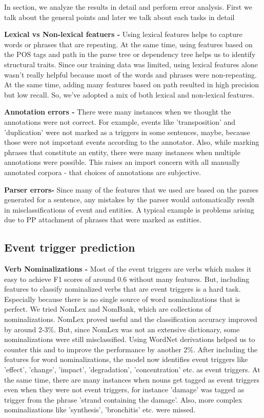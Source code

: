 In section, we analyze the results in detail and perform error analysis. First we talk about the general points and later we talk about each tasks in detail

{\bf Lexical vs Non-lexical featuers -} Using lexical features helps to capture words or phrases that are repeating. At the same time, using features based on the POS tags and path in the parse tree or dependency tree helps us to identify structural traits. Since our training data was limited, using lexical features alone wasn't really helpful because most of the words and phrases were non-repeating. At the same time, adding many features based on path resulted in high precision but low recall. So, we've adopted a mix of both lexical and non-lexical features.

{\bf Annotation errors -} There were many instances when we thought the annotations were not correct. For example, events like 'transposition' and 'duplication' were not marked as a triggers in some sentences, maybe, because those were not important events according to the annotator. Also, while marking phrases that constitute an entity, there were many instances when multiple annotations were possible. This raises an import concern with all manually annotated corpora - that choices of annotations are subjective.

{\bf Parser errors-} Since many of the features that we used are based on the parses generated for a sentence, any mistakes by the parser would automatically result in misclassifications of event and entities. A typical example is problems arising due to PP attachment of phrases that were marked as entities.

\subsection{Event trigger prediction}
{\bf Verb Nominalizations -} Most of the event triggers are verbs which makes it easy to achieve F1 scores of around 0.6 without many features. But, including features to classify nominalized verbs that are event triggers is a hard task. Especially because there is no single source of word nominalizations that is perfect. We tried NomLex and NomBank, which are collections of nominalizations. NomLex proved useful and the classification accuracy improved by around 2-3\%. But, since NomLex was not an extensive dictionary, some nominalizations were still misclassified. Using WordNet derivations helped us to counter this and to improve the performance by another 2\%. After including the features for word nominalizations, the model now identifies event triggers like 'effect', 'change', 'impact', 'degradation', 'concentration' etc. as event triggers. At the same time, there are many instances when nouns get tagged as event triggers even when they were not event triggers, for instance 'damage' was tagged as trigger from the phrase 'strand containing the damage'. Also, more complex nominalizations like 'synthesis', 'bronchitis' etc. were missed.

